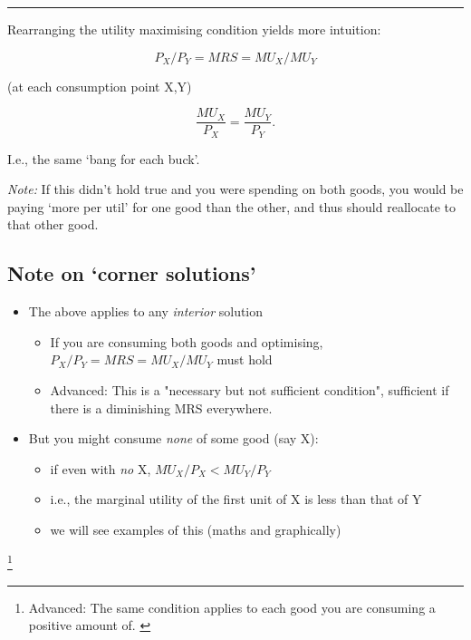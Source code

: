 \documentclass[]{article}
\providecommand{\tightlist}{%
  \setlength{\itemsep}{0pt}\setlength{\parskip}{0pt}}
\begin{document}
\begin{center}\rule{0.5\linewidth}{\linethickness}\end{center}

Rearranging the utility maximising condition yields more intuition:

\[P_X/P_Y = MRS = MU_X/MU_Y\]

(at each consumption point X,Y)

\[\frac{MU_X}{P_X} = \frac{MU_Y}{P_Y}.\]

\bigskip

I.e., the same `bang for each buck'.

\emph{Note:} If this didn't hold true and you were spending on both
goods, you would be paying `more per util' for one good than the other,
and thus should reallocate to that other good.

\hypertarget{note-on-corner-solutions}{%
\subsection{Note on `corner solutions'}\label{note-on-corner-solutions}}

\begin{itemize}
\tightlist
\item
  The above applies to any \emph{interior} solution

  \begin{itemize}
  \tightlist
  \item
    If you are consuming both goods and optimising,
    \(P_X/P_Y = MRS = MU_X/MU_Y\) must hold
  \item
    \textcolor{RawSienna}{Advanced: This is a "necessary but not sufficient condition", sufficient if there is a diminishing MRS everywhere.}
  \end{itemize}
\item
  But you might consume \emph{none} of some good (say X):

  \begin{itemize}
  \tightlist
  \item
    if even with \emph{no} X, \(MU_X/P_X<MU_Y/P_Y\)
  \item
    i.e., the marginal utility of the first unit of X is less than that
    of Y
  \item
    we will see examples of this (maths and graphically)
  \end{itemize}
\end{itemize}

\footnote{\textcolor{RawSienna}{Advanced: The same condition applies to each good you are consuming a positive amount of. }}
\end{document}
